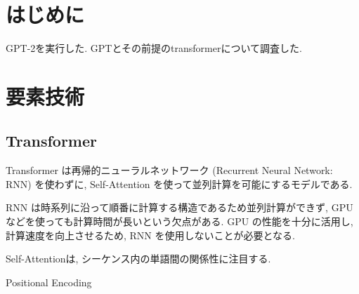 \documentclass[twocolumn]{jarticle}     %
\begin{document}


\section{はじめに}
GPT-2\cite{radford2019language}を実行した.
GPTとその前提のtransformer\cite{DBLP:journals/corr/VaswaniSPUJGKP17}について調査した.

\section{要素技術}
\subsection{Transformer}
Transformer\cite{DBLP:journals/corr/VaswaniSPUJGKP17} は再帰的ニューラルネットワーク (Recurrent Neural Network: RNN)\cite{mikolov2010recurrent} を使わずに, Self-Attention を使って並列計算を可能にするモデルである.

RNN は時系列に沿って順番に計算する構造であるため並列計算ができず,
GPU などを使っても計算時間が長いという欠点がある.
GPU の性能を十分に活用し, 計算速度を向上させるため, RNN を使用しないことが必要となる.

Self-Attentionは, シーケンス内の単語間の関係性に注目する.

Positional Encoding
\end{document}
